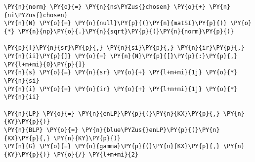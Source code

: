 \begin{Verbatim}[commandchars=\\\{\}]
\PY{n}{norm} \PY{o}{=} \PY{n}{ns\PYZus{}chosen} \PY{o}{+} \PY{n}{ni\PYZus{}chosen}
\PY{n}{N} \PY{o}{=} \PY{n}{null}\PY{p}{(}\PY{n}{matSI}\PY{p}{)} \PY{o}{*} \PY{n}{np}\PY{o}{.}\PY{n}{sqrt}\PY{p}{(}\PY{n}{norm}\PY{p}{)}

\PY{p}{[}\PY{n}{sr}\PY{p}{,} \PY{n}{si}\PY{p}{,} \PY{n}{ir}\PY{p}{,} \PY{n}{ii}\PY{p}{]} \PY{o}{=} \PY{n}{N}\PY{p}{[}\PY{p}{:}\PY{p}{,} \PY{l+m+mi}{0}\PY{p}{]}
\PY{n}{s} \PY{o}{=} \PY{n}{sr} \PY{o}{+} \PY{l+m+mi}{1j} \PY{o}{*} \PY{n}{si}
\PY{n}{i} \PY{o}{=} \PY{n}{ir} \PY{o}{+} \PY{l+m+mi}{1j} \PY{o}{*} \PY{n}{ii}

\PY{n}{LP} \PY{o}{=} \PY{n}{enLP}\PY{p}{(}\PY{n}{KX}\PY{p}{,} \PY{n}{KY}\PY{p}{)}
\PY{n}{BLP} \PY{o}{=} \PY{n}{blue\PYZus{}enLP}\PY{p}{(}\PY{n}{KX}\PY{p}{,} \PY{n}{KY}\PY{p}{)}
\PY{n}{G} \PY{o}{=} \PY{n}{gamma}\PY{p}{(}\PY{n}{KX}\PY{p}{,} \PY{n}{KY}\PY{p}{)} \PY{o}{/} \PY{l+m+mi}{2}


\end{Verbatim}

